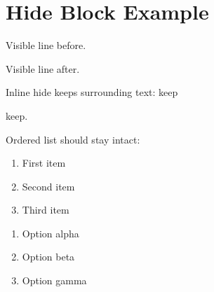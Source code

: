 \section{Hide Block Example}\label{hide-block-example}

Visible line before.

Visible line after.

Inline hide keeps surrounding text: keep

keep.

Ordered list should stay intact:

\begin{enumerate}
\def\labelenumi{\arabic{enumi}.}
\tightlist
\item
  First item
\item
  Second item
\item
  Third item
\end{enumerate}

\begin{enumerate}
\def\labelenumi{\Alph{enumi})}
\tightlist
\item
  Option alpha
\item
  Option beta
\item
  Option gamma
\end{enumerate}
